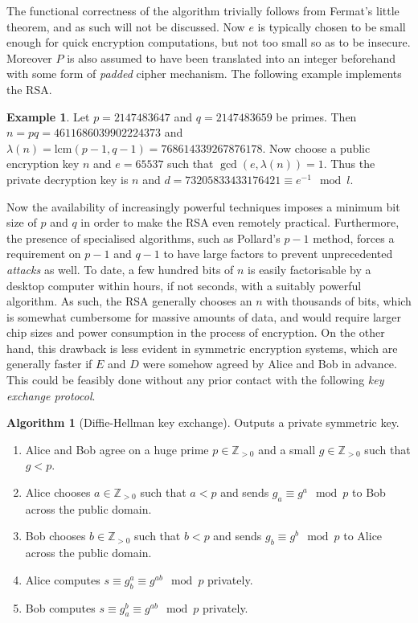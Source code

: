 \documentclass{article}
\newcommand{\Z}{\mathbb{Z}}
\newcommand{\rb}[1]{\left( #1 \right)}
\theoremstyle{definition}\newtheorem*{definition}{Definition}
\theoremstyle{definition}\newtheorem*{example}{Example}
\theoremstyle{definition}\newtheorem*{remark}{Remark}
\newtheorem{algorithm}[proposition]{Algorithm}
\begin{document}
The functional correctness of the algorithm trivially follows from Fermat's little theorem, and as such will not be discussed. Now $ e $ is typically chosen to be small enough for quick encryption computations, but not too small so as to be insecure. Moreover $ P $ is also assumed to have been translated into an integer beforehand with some form of \emph{padded} cipher mechanism. The following example implements the RSA.

\begin{example}
Let $ p = 2147483647 $ and $ q = 2147483659 $ be primes. Then $ n = pq = 4611686039902224373 $ and $ \lambda\rb{n} = \text{lcm}\rb{p - 1, q - 1} = 768614339267876178 $. Now choose a public encryption key $ n $ and $ e = 65537 $ such that $ \gcd\rb{e, \lambda\rb{n}} = 1 $. Thus the private decryption key is $ n $ and $ d = 73205833433176421 \equiv e^{-1} \mod l $.
\end{example}

Now the availability of increasingly powerful techniques imposes a minimum bit size of $ p $ and $ q $ in order to make the RSA even remotely practical. Furthermore, the presence of specialised algorithms, such as Pollard's $ p - 1 $ method, forces a requirement on $ p - 1 $ and $ q - 1 $ to have large factors to prevent unprecedented \emph{attacks} as well. To date, a few hundred bits of $ n $ is easily factorisable by a desktop computer within hours, if not seconds, with a suitably powerful algorithm. As such, the RSA generally chooses an $ n $ with thousands of bits, which is somewhat cumbersome for massive amounts of data, and would require larger chip sizes and power consumption in the process of encryption. On the other hand, this drawback is less evident in symmetric encryption systems, which are generally faster if $ E $ and $ D $ were somehow agreed by Alice and Bob in advance. This could be feasibly done without any prior contact with the following \emph{key exchange protocol}.

\begin{algorithm}[Diffie-Hellman key exchange]
Outputs a private symmetric key.
\begin{enumerate}
\item Alice and Bob agree on a huge prime $ p \in \Z_{> 0} $ and a small $ g \in \Z_{> 0} $ such that $ g < p $.
\item Alice chooses $ a \in \Z_{> 0} $ such that $ a < p $ and sends $ g_a \equiv g^a \mod p $ to Bob across the public domain.
\item Bob chooses $ b \in \Z_{> 0} $ such that $ b < p $ and sends $ g_b \equiv g^b \mod p $ to Alice across the public domain.
\item Alice computes $ s \equiv g_b^a \equiv g^{ab} \mod p $ privately.
\item Bob computes $ s \equiv g_a^b \equiv g^{ab} \mod p $ privately.
\end{enumerate}
\end{algorithm}
\end{document}
